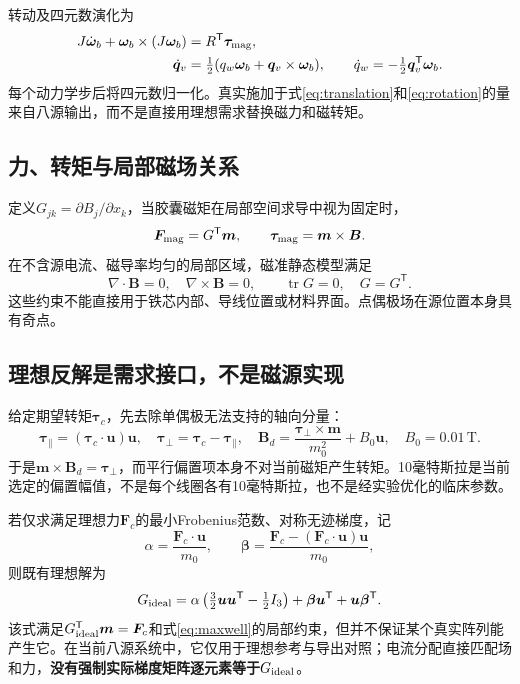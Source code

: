 \documentclass[UTF8,a4paper,zihao=5,fontset=windows]{ctexart}
\newcommand{\vect}[1]{\bm{#1}}
\newcommand{\tr}{\operatorname{tr}}
\newcommand{\unit}[1]{\,\mathrm{#1}}
\begin{document}
转动及四元数演化为
\begin{align}
J\dot{\vect\omega}_b+\vect\omega_b\times(J\vect\omega_b)&=R^{\mathsf T}\vect\tau_{\rm mag},\label{eq:rotation}\\
\dot{\vect q}_v&=\tfrac12(q_w\vect\omega_b+\vect q_v\times\vect\omega_b),\qquad \dot q_w=-\tfrac12\vect q_v^{\mathsf T}\vect\omega_b.
\label{eq:quaternion}
\end{align}
每个动力学步后将四元数归一化。真实施加于式\eqref{eq:translation}和\eqref{eq:rotation}的量来自八源输出，而不是直接用理想需求替换磁力和磁转矩。

\subsection{力、转矩与局部磁场关系}
定义$G_{jk}=\partial B_j/\partial x_k$，当胶囊磁矩在局部空间求导中视为固定时，
\begin{equation}
\vect F_{\rm mag}=G^{\mathsf T}\vect m,\qquad \vect\tau_{\rm mag}=\vect m\times\vect B.
\label{eq:wrench}
\end{equation}
在不含源电流、磁导率均匀的局部区域，磁准静态模型满足
\begin{equation}
\nabla\cdot\vect B=0,\quad \nabla\times\vect B=0,\qquad \tr G=0,\quad G=G^{\mathsf T}.
\label{eq:maxwell}
\end{equation}
这些约束不能直接用于铁芯内部、导线位置或材料界面。点偶极场在源位置本身具有奇点。

\subsection{理想反解是需求接口，不是磁源实现}
给定期望转矩$\vect\tau_c$，先去除单偶极无法支持的轴向分量：
\begin{equation}
\vect\tau_\parallel=(\vect\tau_c\cdot\vect u)\vect u,\quad
\vect\tau_\perp=\vect\tau_c-\vect\tau_\parallel,\quad
\vect B_d=\frac{\vect\tau_\perp\times\vect m}{m_0^2}+B_0\vect u,\quad B_0=0.01\unit T.
\label{eq:field_inverse}
\end{equation}
于是$\vect m\times\vect B_d=\vect\tau_\perp$，而平行偏置项本身不对当前磁矩产生转矩。10毫特斯拉是当前选定的偏置幅值，不是每个线圈各有10毫特斯拉，也不是经实验优化的临床参数。

若仅求满足理想力$\vect F_c$的最小Frobenius范数、对称无迹梯度，记
\begin{equation}
\alpha=\frac{\vect F_c\cdot\vect u}{m_0},\qquad
\vect\beta=\frac{\vect F_c-(\vect F_c\cdot\vect u)\vect u}{m_0},
\end{equation}
则既有理想解为
\begin{equation}
G_{\rm ideal}=\alpha\left(\tfrac32\vect u\vect u^{\mathsf T}-\tfrac12 I_3\right)
+\vect\beta\vect u^{\mathsf T}+\vect u\vect\beta^{\mathsf T}.
\label{eq:ideal_gradient}
\end{equation}
该式满足$G_{\rm ideal}^{\mathsf T}\vect m=\vect F_c$和式\eqref{eq:maxwell}的局部约束，但并不保证某个真实阵列能产生它。在当前八源系统中，它仅用于理想参考与导出对照；电流分配直接匹配场和力，\textbf{没有强制实际梯度矩阵逐元素等于$G_{\rm ideal}$}。
\end{document}
